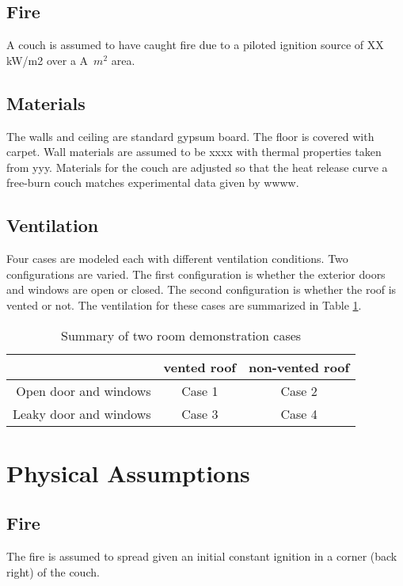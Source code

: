 \documentclass[11pt]{book}
\begin{document}
\subsection{Fire}
A couch is assumed to have caught fire due to a piloted ignition source of XX kW/m2 over
a A~$m^2$ area.


\subsection{Materials}
The walls and ceiling are standard gypsum board.  The floor is 
covered with carpet.  Wall materials are assumed to be xxxx with thermal properties taken from yyy.  Materials for the couch
are adjusted so that the heat release curve a free-burn couch matches experimental data given by wwww.

\subsection{Ventilation}
Four cases are modeled each with different ventilation conditions.  Two configurations are varied.  The first configuration is whether the exterior doors and windows are open or closed.  The second configuration is whether the roof is vented or not.  The ventilation for these cases are summarized in Table \ref{tab:demoranch}.

\begin{table}[ht]
\caption{Summary of two room demonstration cases}
\vspace{0.1in}
\label{tab:demoranch}
\begin{center}
\begin{tabular}{|r||c|c|}
  \hline
   & vented roof & non-vented roof \\ \hline
  Open door and windows & Case 1 & Case 2 \\
  Leaky door and windows & Case 3 & Case 4 \\
  \hline
  \end{tabular}
\end{center}
\end{table}

\section{Physical Assumptions}
\subsection{Fire}
The fire is assumed to spread given an initial constant ignition in a corner
(back right) of the couch.  
\end{document}
